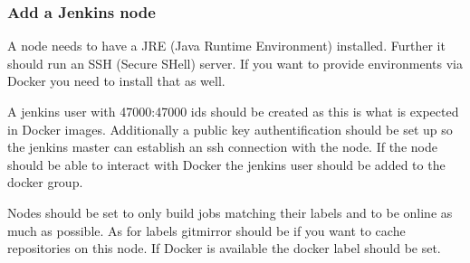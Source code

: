 \subsubsection*{Add a Jenkins node}

A node needs to have a J\+RE (Java Runtime Environment) installed. Further it should run an S\+SH (Secure S\+Hell) server. If you want to provide environments via Docker you need to install that as well.

A {\ttfamily jenkins} user with 47000\+:47000 ids should be created as this is what is expected in Docker images. Additionally a public key authentification should be set up so the jenkins master can establish an ssh connection with the node. If the node should be able to interact with Docker the jenkins user should be added to the {\ttfamily docker} group.

Nodes should be set to only build jobs matching their labels and to be online as much as possible. As for labels {\ttfamily gitmirror} should be if you want to cache repositories on this node. If Docker is available the {\ttfamily docker} label should be set. 